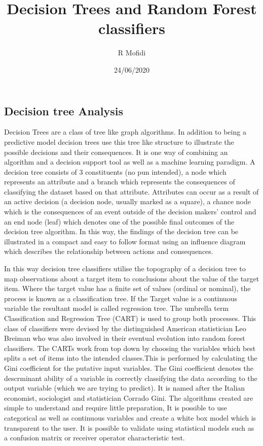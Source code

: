 \documentclass[
]{article}
\title{Decision Trees and Random Forest classifiers}
\author{R Mofidi}
\date{24/06/2020}
\begin{document}
\maketitle

\hypertarget{decision-tree-analysis}{%
\subsection{Decision tree Analysis}\label{decision-tree-analysis}}

Decision Trees are a class of tree like graph algorithms. In addition to
being a predictive model decision trees use this tree like structure to
illustrate the possible decisions and their consequences. It is one way
of combining an algorithm and a decision support tool as well as a
machine learning paradigm. A decision tree consists of 3 constituents
(no pun intended), a node which represents an attribute and a branch
which represents the consequences of classifying the dataset based on
that attribute. Attributes can occur as a result of an active decision
(a decision node, usually marked as a square), a chance node which is
the consequences of an event outside of the decision makers' control and
an end node (leaf) which denotes one of the possible final outcomes of
the decision tree algorithm. In this way, the findings of the decision
tree can be illustrated in a compact and easy to follow format using an
influence diagram which describes the relationship between actions and
consequences.

In this way decision tree classifiers utilise the topography of a
decision tree to map observations about a target item to conclusions
about the value of the target item. Where the target value has a finite
set of values (ordinal or nominal), the process is known as a
classification tree. If the Target value is a continuous variable the
resultant model is called regression tree. The umbrella term
Classification and Regression Tree (CART) is used to group both
processes. This class of classifiers were devised by the distinguished
American statistician Leo Breiman who was also involved in their
eventual evolution into random forest classifiers. The CARTs work from
top down by choosing the variables which best splits a set of items into
the intended classes.This is performed by calculating the Gini
coefficient for the putative input variables. The Gini coefficient
denotes the descrminant ability of a variable in correctly classifying
the data according to the output variable (which we are trying to
predict). It is named after the Italian economist, sociologist and
statistician Corrado Gini. The algorithms created are simple to
understand and require little preparation, It is possible to use
categorical as well as continuous variables and create a white box model
which is transparent to the user. It is possible to validate using
statistical models such as a confusion matrix or receiver operator
characteristic test.
\end{document}

